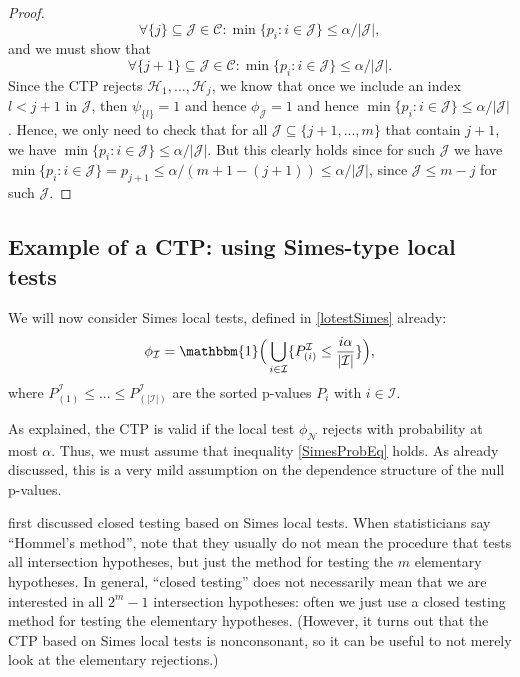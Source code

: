 \documentclass[11pt]{article}
\theoremstyle{plain}
\theoremstyle{definition}
\newcommand{\N}{\mathcal{N}}
\newcommand{\I}{\mathcal{I}}
\newcommand{\J}{\mathcal{J}}
\newcommand{\Hy}{\mathcal{H}}
\newcommand{\subs}{\mathcal{C}}
\newcommand{\citt}{\citet}
\begin{document}
\begin{proof}
 $$\forall\{{j}\} \subseteq \J \in \subs: \min\{p_i: i\in \J\}\leq \alpha/ |\J|,$$
and we must show that 
$$ \forall\{{j+1}\} \subseteq \J \in \subs: \min\{p_i: i\in \J\}\leq \alpha/ |\J|.$$
Since the CTP rejects $\Hy_1,...,\Hy_j$, we know that once we include an index $l<j+1$ in $\J$, then $\psi_{\{l\}}=1$ and hence  $\phi_{\J}=1$ and hence  $\min\{p_i: i\in \J\}\leq \alpha/ |\J|$.
Hence, we only need to check that for all $\J\subseteq\{j+1,...,m\}$ that contain $j+1$, we have $\min\{p_i: i\in \J\}\leq \alpha/ |\J|$. But this clearly holds since for such $\J$ we have  $\min\{p_i: i\in \J\}=p_{j+1}\leq \alpha/(m+1-(j+1))\leq \alpha/|\J|$, since $\J\leq m-j$ for such $\J$.
\end{proof}

\subsection{Example of a CTP: using Simes-type local tests}\label{secHommel}
We will now consider Simes local tests, defined in \eqref{lotestSimes} already:
$$\phi_{\I} = \mathbbm{1}\Big( \bigcup_{i\in \I} \{P^{\I}_{(i)}\leq \frac{i\alpha}{|\I|} \}  \Big),$$
where $P^{\I}_{(1)}\leq ...\leq P^{\I}_{(|\I|)}$ are  the sorted p-values $P_i$ with $i\in \I$.

As explained, the CTP is  valid if the  local test $\phi_{\N}$ rejects with probability at most $\alpha$. Thus, we must assume that inequality \eqref{SimesProbEq} holds. As already discussed, this is a very mild assumption on the dependence structure of the null  p-values.

\citt{hommel1988stagewise} first discussed closed testing based on Simes local tests. 
When statisticians say ``Hommel's method'', note that they usually do not mean the procedure that tests all intersection hypotheses, but just the method for testing the  $m$ elementary hypotheses. In general, ``closed testing'' does not necessarily mean that we are interested in all $2^m-1$ intersection hypotheses: often we just use a closed testing method for testing the elementary hypotheses. (However, it turns out that the CTP based on Simes local tests is nonconsonant, so it can be useful to not merely look at the elementary rejections.)
\end{document}
